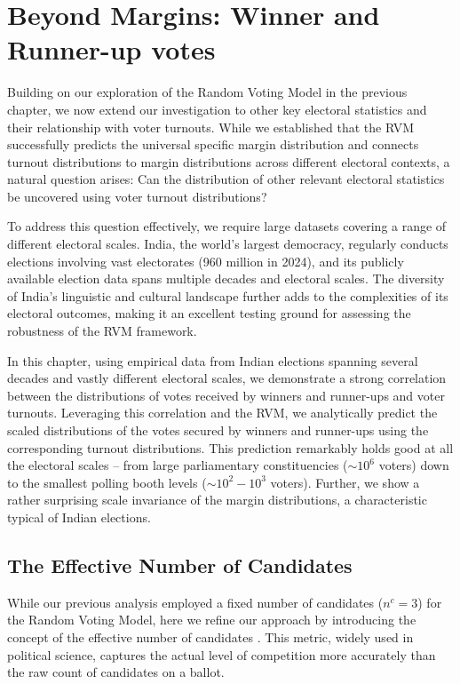 \chapter{Beyond Margins: Winner and Runner-up votes}
\label{chap6}

Building on our exploration of the Random Voting Model in the previous chapter, we now extend our investigation to other key electoral statistics and their relationship with voter turnouts. While we established that the RVM successfully predicts the universal specific margin distribution and connects turnout distributions to margin distributions across different electoral contexts, a natural question arises: Can the distribution of other relevant electoral statistics be uncovered using voter turnout distributions?

To address this question effectively, we require large datasets covering a range of different electoral scales. India, the world's largest democracy, regularly conducts elections involving vast electorates (960 million in 2024), and its publicly available election data spans multiple decades and electoral scales. The diversity of India's linguistic and cultural landscape further adds to the complexities of its electoral outcomes, making it an excellent testing ground for assessing the robustness of the RVM framework.

In this chapter, using empirical data from Indian elections spanning several decades and vastly different electoral scales, we demonstrate a strong correlation between the distributions of votes received by winners and runner-ups and voter turnouts. Leveraging this correlation and the RVM, we analytically predict the scaled distributions of the votes secured by winners and runner-ups using the corresponding turnout distributions. This prediction remarkably holds good at all the electoral scales -- from large parliamentary constituencies ($ \sim 10^6$ voters) down to the smallest polling booth levels ($\sim 10^2-10^3$ voters). Further, we show a rather surprising scale invariance of the margin distributions, a characteristic typical of Indian elections. 

\section{The Effective Number of Candidates}
While our previous analysis employed a fixed number of candidates ($n^c = 3$) for the Random Voting Model, here we refine our approach by introducing the concept of the effective number of candidates \cite{laakso1979effective}. This metric, widely used in political science, captures the actual level of competition more accurately than the raw count of candidates on a ballot.

